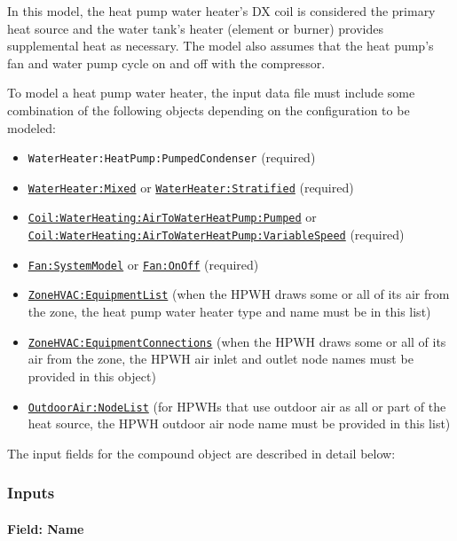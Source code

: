 In this model, the heat pump water heater's DX coil is considered the primary heat source and the water tank's heater (element or burner) provides supplemental heat as necessary. The model also assumes that the heat pump's fan and water pump cycle on and off with the compressor.

To model a heat pump water heater, the input data file must include some combination of the following objects depending on the configuration to be modeled:

\begin{itemize}
\item
  \lstinline!WaterHeater:HeatPump:PumpedCondenser! (required)
\item
   \hyperref[waterheatermixed]{\lstinline!WaterHeater:Mixed!} or \hyperref[waterheaterstratified]{\lstinline!WaterHeater:Stratified!} (required)
\item
  \hyperref[coilwaterheatingairtowaterheatpumppumped]{\lstinline!Coil:WaterHeating:AirToWaterHeatPump:Pumped!} or \hyperref[coil-waterheating-airtowaterheatpump-variablespeed]{\lstinline!Coil:WaterHeating:AirToWaterHeatPump:VariableSpeed!} (required)
\item
  \hyperref[fansystemmodel]{\lstinline!Fan:SystemModel!} or \hyperref[fanonoff]{\lstinline!Fan:OnOff!} (required)
\item
  \hyperref[zonehvacequipmentlist]{\lstinline!ZoneHVAC:EquipmentList!} (when the HPWH draws some or all of its air from the zone, the heat pump water heater type and name must be in this list)
\item
  \hyperref[zonehvacequipmentconnections]{\lstinline!ZoneHVAC:EquipmentConnections!} (when the HPWH draws some or all of its air from the zone, the HPWH air inlet and outlet node names must be provided in this object)
\item
  \hyperref[outdoorairnodelist]{\lstinline!OutdoorAir:NodeList!} (for HPWHs that use outdoor air as all or part of the heat source, the HPWH outdoor air node name must be provided in this list)
\end{itemize}

The input fields for the compound object are described in detail below:

\subsubsection{Inputs}\label{inputs-3-040}

\paragraph{Field: Name}\label{field-name-2-042}

